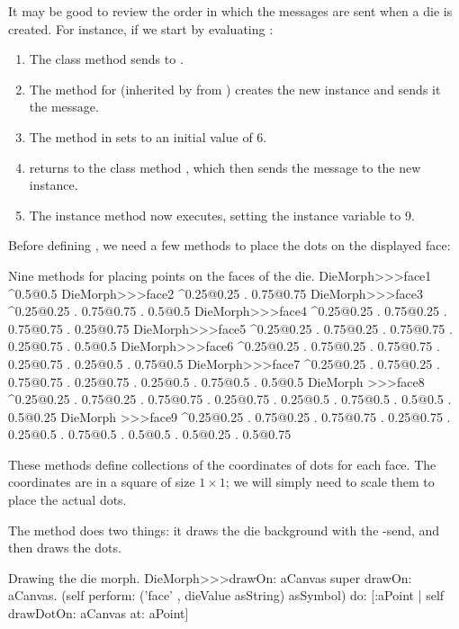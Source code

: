 \documentclass[a4paper,10pt,twoside]{book}
\begin{document}
It may be good to review the order in which the messages are sent when a die is created. For instance, if we start by
evaluating :
\begin{enumerate}
	\item The class method  sends  to .
	\item The method for  (inherited by  from ) creates the new instance and sends it the  message.
	\item The  method in  sets  to an initial value of 6.
	\item {} returns to the class method , which then sends the message  to the new instance.
	\item The instance method  now executes, setting the  instance variable to 9.
\end{enumerate}

Before defining , we need a few methods to place the dots on the displayed face:
\begin{methods}{Nine methods for placing points on the faces of the die.}
DieMorph>>>face1
	^{0.5@0.5}
DieMorph>>>face2
	^{0.25@0.25 . 0.75@0.75}
DieMorph>>>face3
	^{0.25@0.25 . 0.75@0.75 . 0.5@0.5}
DieMorph>>>face4
	^{0.25@0.25 . 0.75@0.25 . 0.75@0.75 . 0.25@0.75}
DieMorph>>>face5
	^{0.25@0.25 . 0.75@0.25 . 0.75@0.75 . 0.25@0.75 . 0.5@0.5}
DieMorph>>>face6
	^{0.25@0.25 . 0.75@0.25 . 0.75@0.75 . 0.25@0.75 . 0.25@0.5 . 0.75@0.5}
DieMorph>>>face7
	^{0.25@0.25 . 0.75@0.25 . 0.75@0.75 . 0.25@0.75 . 0.25@0.5 . 0.75@0.5 . 0.5@0.5}
DieMorph >>>face8
	^{0.25@0.25 . 0.75@0.25 . 0.75@0.75 . 0.25@0.75 . 0.25@0.5 . 0.75@0.5 . 0.5@0.5 . 0.5@0.25}
DieMorph >>>face9
	^{0.25@0.25 . 0.75@0.25 . 0.75@0.75 . 0.25@0.75 . 0.25@0.5 . 0.75@0.5 . 0.5@0.5 . 0.5@0.25 . 0.5@0.75}
\end{methods}

These methods define collections of the coordinates of dots for each face. The coordinates are in a square of size $1\times1$; we will simply need to scale them to place the actual dots.

The  method does two things: it draws the die background with the -send, and then draws the dots.
\begin{method}{Drawing the die morph.}
DieMorph>>>drawOn: aCanvas
	super drawOn: aCanvas.
	(self perform: ('face' , dieValue asString) asSymbol)
		do: [:aPoint | self drawDotOn: aCanvas at: aPoint]
\end{method}
\end{document}
